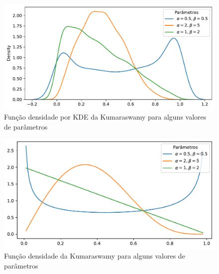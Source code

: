 \documentclass[
]{article}
\begin{document}
\begin{figure}

{\centering \includegraphics{report_files/figure-pdf/fig-density1-output-1.pdf}

}

\caption{\label{fig-density1}Função densidade por KDE da Kumaraswamy
para alguns valores de parâmetros}

\end{figure}

\begin{figure}

{\centering \includegraphics{report_files/figure-pdf/fig-density2-output-1.pdf}

}

\caption{\label{fig-density2}Função densidade da Kumaraswamy para alguns
valores de parâmetros}

\end{figure}
\end{document}

